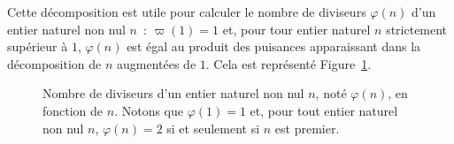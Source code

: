 \noindent
Cette décomposition est utile pour calculer le nombre de diviseurs $\varphi(n)$ d'un entier naturel non nul $n$ : $\varpi(1) = 1$ et, pour tour entier naturel $n$ strictement supérieur à $1$, $\varphi(n)$ est égal au produit des puisances apparaissant dans la décomposition de $n$ augmentées de $1$. 
Cela est représenté Figure~\ref{fig:varphi_n}.


\begin{figure} 
    \centering
    \caption{Nombre de diviseurs d'un entier naturel non nul $n$, noté $\varphi(n)$, en fonction de $n$. 
             Notons que $\varphi(1) = 1$ et, pour tout entier naturel non nul $n$, $\varphi(n) = 2$ si et seulement si $n$ est premier.}
    \label{fig:varphi_n}
\end{figure}

\clearpage

\makeatletter
\renewenvironment{theindex}
  {\if@twocolumn
      \@restonecolfalse
   \else
      \@restonecoltrue
   \fi
   \setlength{\columnseprule}{0pt}
   \setlength{\columnsep}{35pt}
   \begin{multicols}{3}[\section*{\indexname}]
   \addcontentsline{toc}{section}{\indexname}
   \markboth{\MakeUppercase\indexname}%
            {\MakeUppercase\indexname}%
   \thispagestyle{plain}
   \setlength{\parindent}{0pt}
   \setlength{\parskip}{0pt plus 0.3pt}
   \relax
   \let\item\@idxitem}%
  {\end{multicols}\if@restonecol\onecolumn\else\clearpage\fi}
\makeatother

\printindex*

\bye
